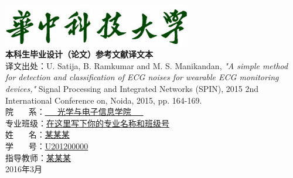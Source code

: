 \begin{titlepage}
\begin{center}
~~\\ 
\vspace{2.6cm}
\includegraphics[scale=1.3]{univ-title.png}
\\
\erhao
\vspace{1.3cm}
\zhongsong \textbf{本科生毕业设计（论文）参考文献译文本\\}
\vspace{2cm}
\fontsize{15.75pt}{20pt}\selectfont
{译文出处：U. Satija, B. Ramkumar and M. S. Manikandan, \textit{"A simple method for detection and classification of ECG noises for wearable ECG monitoring devices,"} Signal Processing and Integrated Networks (SPIN), 2015 2nd International Conference on, Noida, 2015, pp. 164-169.\\}
\vspace{1cm}
\fontsize{15.75pt}{48pt}\selectfont 
\zhongsong
院 \quad ~~~系：\underline{\quad \quad ~~~光学与电子信息学院~~~ \quad \quad}\\
专业班级：\underline{在这里写下你的专业名称和班级号} \\ 
姓 \quad ~~~名：\underline{\phantom{aaaaaaaaaaaaaa}某某某\phantom{aaaaaaaaaaaaa}} \\ 
学 \quad ~~~号：\underline{\phantom{aaaaaaaaaaa}U201200000\phantom{aaaaaaaaaaa}} \\ 
指导教师：\underline{\phantom{aaaaaaaaaaaaaa}某某某\phantom{aaaaaaaaaaaaa}} \\
\vspace{1cm}  
2016年3月\\
\end{center}
\end{titlepage}

